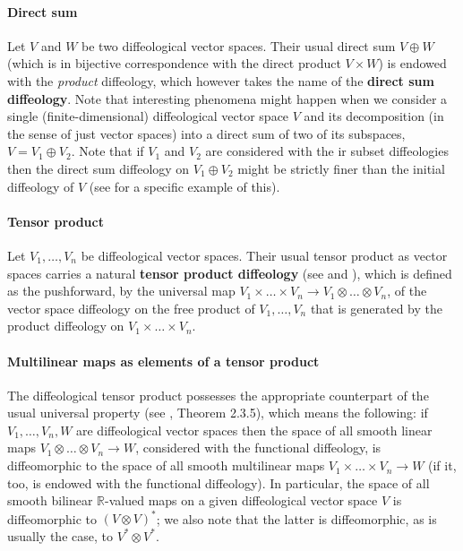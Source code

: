 \documentclass{article}
\newcommand\matR{{\mathbb{R}}}
\begin{document}
\paragraph{Direct sum} Let $V$ and $W$ be two diffeological vector spaces. Their usual direct sum $V\oplus W$ (which is in bijective correspondence with the direct product $V\times W$) is endowed with
the \emph{product} diffeology, which however takes the name of the \textbf{direct sum diffeology}. Note that interesting phenomena might happen when we consider a single (finite-dimensional)
diffeological vector space $V$ and its decomposition (in the sense of just vector spaces) into a direct sum of two of its subspaces, $V=V_1\oplus V_2$. Note that if $V_1$ and $V_2$ are considered with
the ir subset diffeologies then the direct sum diffeology on $V_1\oplus V_2$ might be strictly finer than the initial diffeology of $V$ (see \cite{pseudometric} for a specific example of this).

\paragraph{Tensor product} Let $V_1,\ldots,V_n$ be diffeological vector spaces. Their usual tensor product as vector spaces carries a natural \textbf{tensor product diffeology} (see \cite{vincent} and
\cite{wu}), which is defined as the pushforward, by the universal map $V_1\times\ldots\times V_n\to V_1\otimes\ldots\otimes V_n$, of the vector space diffeology on the free product of $V_1,\ldots,V_n$ 
that is generated by the product diffeology on $V_1\times\ldots\times V_n$.

\paragraph{Multilinear maps as elements of a tensor product} The diffeological tensor product possesses the appropriate counterpart of the usual universal property (see \cite{vincent}, Theorem 2.3.5),
which means the following: if $V_1,\ldots,V_n,W$ are diffeological vector spaces then the space of all smooth linear maps $V_1\otimes\ldots\otimes V_n\to W$, considered with the functional diffeology, 
is diffeomorphic to the space of all smooth multilinear maps $V_1\times\ldots\times V_n\to W$ (if it, too, is endowed with the functional diffeology). In particular, the space of all smooth bilinear $\matR$-valued 
maps on a given diffeological vector space $V$ is diffeomorphic to $(V\otimes V)^*$; we also note that the latter is diffeomorphic, as is usually the case, to $V^*\otimes V^*$.
\end{document}
